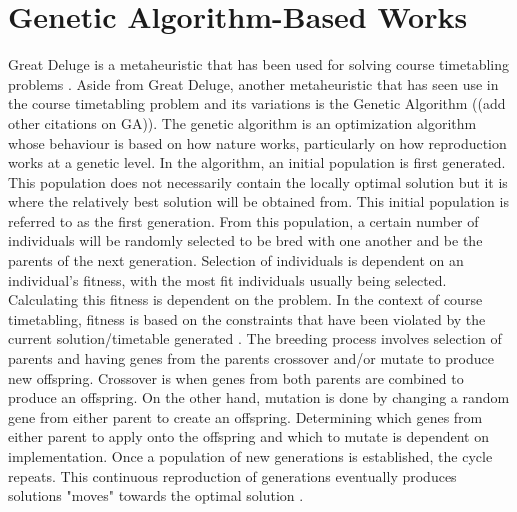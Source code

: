 \section{Genetic Algorithm-Based Works}
Great Deluge is a metaheuristic \cite{intro-gd-dueck} that has been used for solving course timetabling problems \cite{gd-burke}\cite{nlgd-landa-silva}\cite{nlgdrl-obit}. Aside from Great Deluge, another metaheuristic that has seen use in the course timetabling problem and its variations is the Genetic Algorithm ((add other citations on GA)). The genetic algorithm is an optimization algorithm whose behaviour is based on how nature works, particularly on how reproduction works at a genetic level. In the algorithm, an initial population is first generated. This population does not necessarily contain the locally optimal solution but it is where the relatively best solution will be obtained from. This initial population is referred to as the first generation. From this population, a certain number of individuals will be randomly selected to be bred with one another and be the parents of the next generation. Selection of individuals is dependent on an individual's fitness, with the most fit individuals usually being selected. Calculating this fitness is dependent on the problem. In the context of course timetabling, fitness is based on the constraints that have been violated by the current solution/timetable generated \cite{alves-novel-recursive}\cite{raghavjee-ga-south-africa}\cite{johan-ga-sa-comparison}\cite{yik-ga-timetabling}\cite{supachate-noval-approach-ga-thai}\cite{wutthipong-performance-study-genetic-operators}\cite{sanjay-an-application-of-ga}. The breeding process involves selection of parents and having genes from the parents crossover and/or mutate to produce new offspring. Crossover is when genes from both parents are combined to produce an offspring. On the other hand, mutation is done by changing a random gene from either parent to create an offspring. Determining which genes from either parent to apply onto the offspring and which to mutate is dependent on implementation. Once a population of new generations is established, the cycle repeats. This continuous reproduction of generations eventually produces solutions "moves" towards the optimal solution \cite{what-is-ga}.

